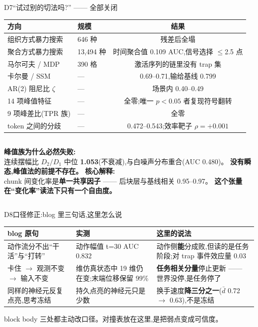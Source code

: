 \documentclass[aspectratio=169,10pt]{beamer}
\newcommand{\hi}[1]{{\color{teai}\bfseries #1}}
\newcommand{\bad}[1]{{\color{alertc}\bfseries #1}}
\newcommand{\takeaway}[1]{%
  \begin{center}\begin{beamercolorbox}[wd=.94\textwidth,sep=6pt,rounded=true]{block body}%
  \centering #1\end{beamercolorbox}\end{center}}
\begin{document}
\begin{frame}{D7\quad “试过别的切法吗?” —— 全部关闭}
  \footnotesize
  \begin{center}
  \begin{tabular}{@{}llc@{}}
    \toprule
    \textbf{方向} & \textbf{规模} & \textbf{结果} \\ \midrule
    组织方式暴力搜索 & 646 种 & 残差后全塌 \\
    聚合方式暴力搜索 & 13{,}494 种 & 时间聚合值 0.109 AUC,信号选择 $\le$2.5 点 \\
    马尔可夫 / MDP & 390 格 & 激活序列的链里没有 trap 集 \\
    卡尔曼 / SSM & --- & 0.69--0.71,输给基线 0.799 \\
    AR(2) 阻尼比 $\zeta$ & --- & 场景内 0.40--0.49 \\
    14 项峰值特征 & --- & 全零;唯一 $p<0.05$ 者复现符号翻转 \\
    9 项峰差比(TPR 族) & --- & 全零 \\
    token 之间的分歧 & --- & 0.472--0.543;效率靶子 $\rho=+0.001$ \\ \bottomrule
  \end{tabular}
  \end{center}
  \vfill
  \begin{columns}[T]
      \textbf{峰值族为什么必然失败:}\\
      连续摆幅比 $D_2/D_1$ 中位 \bad{1.053}(不衰减),与白噪声分布重合(AUC 0.480)。
      \textbf{没有瞬态,峰值法的前提不存在。}
      \textbf{核心解释:}\\
      chunk 间变化率是\hi{单一共享因子} —— 后块层与基线相关 0.95--0.97。
      \textbf{这个张量在“变化率”读法下只有一个自由度。}
  \end{columns}
\end{frame}

\begin{frame}{D8\quad 口径修正:blog 里三句话,这里怎么说}
  \small
  \begin{tabular}{@{}>{\raggedright\arraybackslash}p{3.7cm}>{\raggedright\arraybackslash}p{3.7cm}>{\raggedright\arraybackslash}p{5.9cm}@{}}
    \toprule
    \textbf{blog 原句} & \textbf{实测} & \textbf{这里的说法} \\ \midrule
    动作流分不出“干活”与“打转” & 动作幅值 t=30 AUC 0.832 & 动作侧\textbf{能}分成败,但读的是任务阶段;对 trap 事件效应量 0.03 \\[4pt]
    卡住 $\rightarrow$ 观测不变 $\rightarrow$ 输入不变 & 47 维仿真状态中 19 维仍在变;末端位移保留 99\% & \textbf{任务相关分量}停止更新 —— 世界没停,是任务停了 \\[4pt]
    同样的神经元反复点亮,思考冻结 & 持久点亮的神经元只是少数 & 换手速度\textbf{降三分之一}($\bar d$ 0.72 $\rightarrow$ 0.63),不是冻结 \\ \bottomrule
  \end{tabular}
  \vfill
  \takeaway{\small 三处都主动改口径。对撞表放在这里,是把弱点变成可信度。}
\end{frame}
\end{document}
